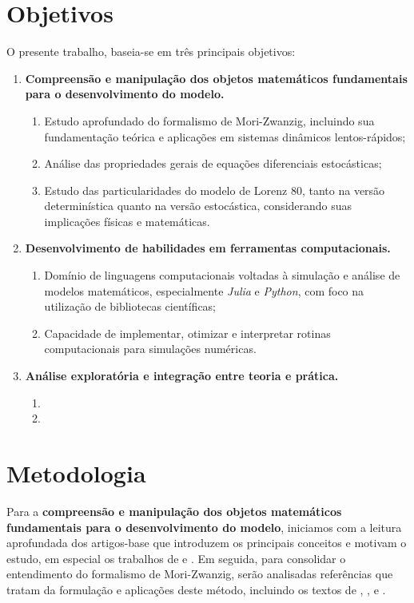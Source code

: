 \documentclass[12pt]{article}
\begin{document}
\section*{Objetivos}
O presente trabalho, baseia-se em três principais objetivos:
\begin{enumerate}
    \item \textbf{Compreensão e manipulação dos objetos matemáticos fundamentais para o desenvolvimento do modelo.}
    \begin{enumerate}
        \item Estudo aprofundado do formalismo de Mori-Zwanzig, incluindo sua fundamentação teórica e aplicações em sistemas dinâmicos lentos-rápidos;
        \item Análise das propriedades gerais de equações diferenciais estocásticas;
        \item Estudo das particularidades do modelo de Lorenz 80, tanto na versão determinística quanto na versão estocástica, considerando suas implicações físicas e matemáticas.
    \end{enumerate}

    \item \textbf{Desenvolvimento de habilidades em ferramentas computacionais.}
    \begin{enumerate}
        \item Domínio de linguagens computacionais voltadas à simulação e análise de modelos matemáticos, especialmente \textit{Julia} e \textit{Python}, com foco na utilização de bibliotecas científicas;
        \item Capacidade de implementar, otimizar e interpretar rotinas computacionais para simulações numéricas.
    \end{enumerate}

    \item \textbf{Análise exploratória e integração entre teoria e prática.}
    \begin{enumerate}
        \item \lipsum[1][2]
        \item \lipsum[2][2]
    \end{enumerate}
\end{enumerate}


\section*{Metodologia}
Para a \textbf{compreensão e manipulação dos objetos matemáticos fundamentais para o desenvolvimento do modelo}, iniciamos com a leitura aprofundada dos artigos-base que introduzem os principais conceitos e motivam o estudo, em especial os trabalhos de \citet{Chekroun2017} e \citet{Chekroun2021}. Em seguida, para consolidar o entendimento do formalismo de Mori-Zwanzig, serão analisadas referências que tratam da formulação e aplicações deste método, incluindo os textos de \citet{Gouasmi2017}, \citet{Chorin2000}, \citet{Chorin2002} e \citet{Chorin2013}.
\end{document}
